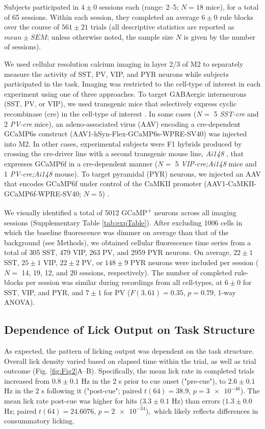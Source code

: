Subjects participated in $4 \pm 0$ sessions each (range: 2--5; $N=18$ mice), for a total of 65 sessions. Within each session, they completed an average $6 \pm 0$ rule blocks over the course of $561 \pm 21$ trials (all descriptive statistics are reported as $mean \pm SEM$; unless otherwise noted, the sample size $N$ is given by the number of sessions).

We used cellular resolution calcium imaging in layer 2/3 of M2 to separately measure the activity of SST, PV, VIP, and PYR neurons while subjects participated in the task. Imaging was restricted to the cell-type of interest in each experiment using one of three approaches. To target GABAergic interneurons (SST, PV, or VIP), we used transgenic mice that selectively express cyclic recombinase (cre) in the cell-type of interest \citep{taniguchi11}. In some cases ($N =$ 5 \emph{SST-cre} and 2 \emph{PV-cre} mice), an adeno-associated virus (AAV) encoding a cre-dependent GCaMP6s construct (AAV1-hSyn-Flex-GCaMP6s-WPRE-SV40) was injected into M2. In other cases, experimental subjects were F1 hybrids produced by crossing the cre-driver line with a second transgenic mouse line, \emph{Ai148} \citep{daigle18}, that expresses GCaMP6f in a cre-dependent manner ($N =$ 5 \emph{VIP-cre;Ai148} mice and 1 \emph{PV-cre;Ai148} mouse). To target pyramidal (PYR) neurons, we injected an AAV that encodes GCaMP6f under control of the CaMKII promoter (AAV1-CaMKII-GCaMP6f-WPRE-SV40; $N = 5$) \citep{kuchibhotla17, ali20}.

We visually identified a total of \num{5012} GCaMP\textsuperscript{+} neurons across all imaging sessions (Supplementary Table \ref{tab:expTable}). After excluding \num{1006} cells in which the baseline fluorescence was dimmer on average than that of the background (see Methods), we obtained cellular fluorescence time series from a total of 305 SST, 479 VIP, 263 PV, and 2959 PYR neurons. On average, $22 \pm 1$ SST, $25 \pm 1$ VIP, $22 \pm 2$ PV, or $148 \pm 9$ PYR neurons were included per session ($N =$ 14, 19, 12, and 20 sessions, respectively). The number of completed rule-blocks per session was similar during recordings from all cell-types, at $6 \pm 0$ for SST, VIP,  and PYR, and $7 \pm 1$ for PV ($F(3,61)=0.35$, $p=0.79$, 1-way ANOVA).      


\subsection*{Dependence of Lick Output on Task Structure}
As expected, the pattern of licking output was dependent on the task structure. Overall lick density varied based on elapsed time within the trial, as well as trial outcome (Fig. \ref{fig:Fig2}A--B). Specifically, the mean lick rate in completed trials increased from $0.8 \pm 0.1$ Hz in the 2 s prior to cue onset ("pre-cue"), to $2.6 \pm 0.1$ Hz in the 2 s following it ("post-cue"; paired $t(64) =38.9$, $p=\num{3e-46}$). The mean lick rate post-cue was higher for hits ($3.3 \pm 0.1$ Hz) than errors ($1.3 \pm 0.0$ Hz; paired $t(64) =24.6076$, $p=\num{2e-34}$),\ which likely reflects differences in consummatory licking.

